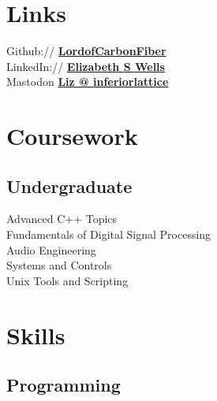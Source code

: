 \documentclass[letterpaper]{deedy-resume-openfont} %
\begin{document}
\begin{minipage}[t]{0.33\textwidth}

\section{Links}

Github:// \href{https://github.com/lordofcarbonfiber}{\bf LordofCarbonFiber } \\
LinkedIn:// \href{https://www.linkedin.com/in/elizabethswells/s}{\bf Elizabeth S Wells} \\
Mastodon \href{@liz@mastodon.inferiorlattice.com}{ \bf Liz @ inferiorlattice} \\




\section{Coursework}

\subsection{Undergraduate}

Advanced C++ Topics \\
Fundamentals of Digital Signal Processing \\
Audio Engineering \\
 Systems and Controls\\
Unix Tools and Scripting

\sectionspace %


\section{Skills}

\subsection{Programming}


\end{minipage}
\end{document}
